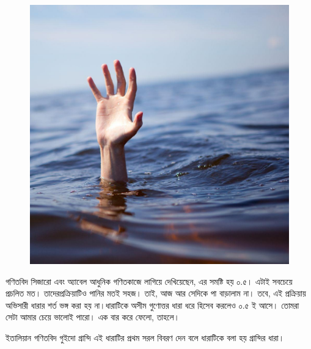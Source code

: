 \documentclass[
]{book}
\begin{document}
\begin{figure}

{\centering \includegraphics[width=0.8\linewidth]{img/drowning} 

}

\end{figure}

গণিতবিদ সিজারো এবং অ্যাবেল আধুনিক গণিতকাজে লাগিয়ে দেখিয়েছেন, এর সমষ্টি হয় ০.৫। এটাই সবচেয়ে প্রচলিত মত। তাদেরপ্রক্রিয়াটিও পানির মতই সহজ। তাই, আজ আর সেদিকে পা বাড়ালাম না। তবে, এই প্রক্রিয়ায় অভিসারী ধারার শর্ত ভঙ্গ করা হয় না।ধারাটিকে অসীম গুণোত্তর ধারা ধরে হিসেব করলেও ০.৫ ই আসে। তোমরা সেটা আমার চেয়ে ভালোই পারো। এক বার করে ফেলো, তাহলে।

ইতালিয়ান গণিতবিদ গুইদো গ্রান্দি এই ধারাটির প্রথম সরল বিবরণ দেন বলে ধারাটিকে বলা হয় গ্রান্দির ধারা।

  
\end{document}
